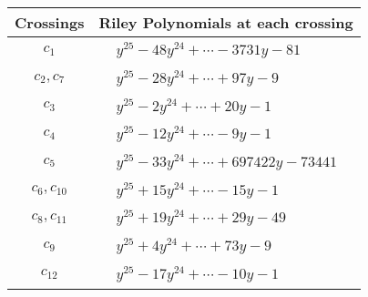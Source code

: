 \documentclass[1p]{elsarticle_modified}
\theoremstyle{definition}
\begin{document}
\begin{tabular}{m{50pt}|m{274pt}}
Crossings & \hspace{64pt}Riley Polynomials at each crossing \\
\hline $$\begin{aligned}c_{1}\end{aligned}$$&$\begin{aligned}
&y^{25}-48 y^{24}+\cdots-3731 y-81
\end{aligned}$\\
\hline $$\begin{aligned}c_{2},c_{7}\end{aligned}$$&$\begin{aligned}
&y^{25}-28 y^{24}+\cdots+97 y-9
\end{aligned}$\\
\hline $$\begin{aligned}c_{3}\end{aligned}$$&$\begin{aligned}
&y^{25}-2 y^{24}+\cdots+20 y-1
\end{aligned}$\\
\hline $$\begin{aligned}c_{4}\end{aligned}$$&$\begin{aligned}
&y^{25}-12 y^{24}+\cdots-9 y-1
\end{aligned}$\\
\hline $$\begin{aligned}c_{5}\end{aligned}$$&$\begin{aligned}
&y^{25}-33 y^{24}+\cdots+697422 y-73441
\end{aligned}$\\
\hline $$\begin{aligned}c_{6},c_{10}\end{aligned}$$&$\begin{aligned}
&y^{25}+15 y^{24}+\cdots-15 y-1
\end{aligned}$\\
\hline $$\begin{aligned}c_{8},c_{11}\end{aligned}$$&$\begin{aligned}
&y^{25}+19 y^{24}+\cdots+29 y-49
\end{aligned}$\\
\hline $$\begin{aligned}c_{9}\end{aligned}$$&$\begin{aligned}
&y^{25}+4 y^{24}+\cdots+73 y-9
\end{aligned}$\\
\hline $$\begin{aligned}c_{12}\end{aligned}$$&$\begin{aligned}
&y^{25}-17 y^{24}+\cdots-10 y-1
\end{aligned}$\\
\hline
\end{tabular}\\~\\
\end{document}
